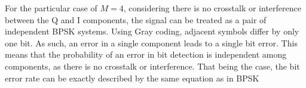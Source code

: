 %
%
%
%
%
%
%
%
%
%
%

For the particular case of $M=4$, considering there is no crosstalk or interference between the Q and I components, the signal can be treated as a pair of independent BPSK systems.
Using Gray coding, adjacent symbols differ by only one bit. As such, an error in a single component leads to a single bit error.
This means that the probability of an error in bit detection is independent among components, as there is no crosstalk or interference. That being the case, the bit error rate can be exactly described by the same equation as in BPSK

